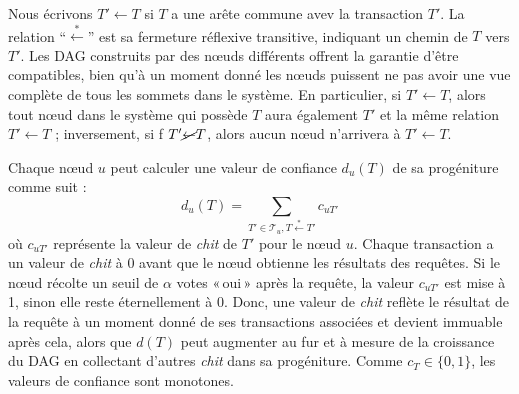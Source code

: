 Nous écrivons $T' \gets T$ si $T$ a une arête commune avev la transaction $T'$.
La relation ``$\stackrel{*}{\gets}$'' est sa fermeture réflexive transitive, indiquant un chemin de $T$ vers $T'$.
Les DAG construits par des nœuds différents offrent la garantie d'être compatibles, bien qu'à un moment donné les nœuds puissent ne pas avoir une vue complète de tous les sommets dans le système.
En particulier, si $T' \gets T$, alors tout nœud dans le système qui possède $T$ aura également $T'$ et la même relation $T' \gets T$ ; inversement, si f $T' \cancel{\gets} T$, alors aucun nœud n'arrivera à $T' \gets T$.

Chaque nœud $u$ peut calculer une valeur de confiance $d_u(T)$ de sa progéniture comme suit :
\[ d_u(T) = \sum_{T' \in \mathcal{T}_u, T \stackrel{*}{\gets} T'}c_{uT'}\]
où $c_{uT'}$ représente la valeur de \emph{chit} de $T'$ pour le nœud $u$. Chaque transaction a un valeur de \emph{chit} à $0$ avant que le nœud obtienne les résultats des requêtes. Si le nœud récolte un seuil de $\alpha$ votes «\,oui\,» après la requête, la valeur $c_{uT'}$ est mise à 1, sinon elle reste éternellement à $0$.
Donc, une valeur de \emph{chit} reflète le résultat de la requête à un moment donné de ses transactions associées et devient immuable après cela, alors que $d(T)$ peut augmenter au fur et à mesure de la croissance du DAG en collectant d'autres \emph{chit} dans sa progéniture.
Comme $c_T \in \{0, 1\}$, les valeurs de confiance sont monotones.

